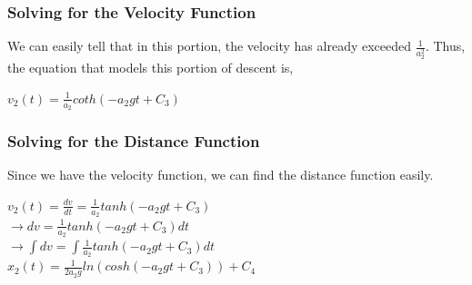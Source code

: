 \documentclass{article}
\begin{document}
	\subsubsection{Solving for the Velocity Function}
	We can easily tell that in this portion, the velocity has already exceeded $\frac{1}{a_2^2}$. Thus, the equation that models this portion of descent is,
	\begin{center}
		$v_2(t)=\frac{1}{a_2} coth(-a_2gt+C_3)$
	\end{center}
	\subsubsection{Solving for the Distance Function}
	Since we have the velocity function, we can find the distance function easily.
	\begin{center}
		$v_2(t)=\frac{dv}{dt} =\frac{1}{a_2} tanh(-a_2gt+C_3)$\\
		$\rightarrow dv = \frac{1}{a_2} tanh(-a_2gt+C_3)dt$\\
		$\rightarrow \int dv = \int \frac{1}{a_2} tanh(-a_2gt+C_3)dt$\\
		$x_2(t) = \frac{1}{2a_2g} ln(cosh(-a_2gt+C_3))+C_4$
	\end{center}
\end{document}
